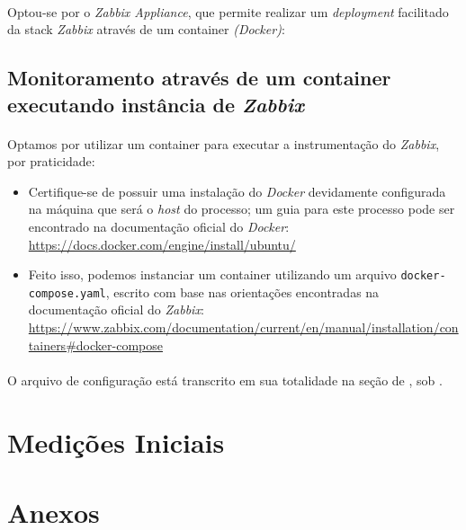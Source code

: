 \documentclass[12pt]{article}
\begin{document}
\paragraph{}
Optou-se por o \textit{Zabbix Appliance}, que permite realizar um \textit{deployment} facilitado
da stack \textit{Zabbix} através de um container \textit{(Docker)}:

\subsection{Monitoramento através de um container executando instância de \textit{Zabbix}}
\paragraph{}
Optamos por utilizar um container para executar a instrumentação do \textit{Zabbix}, por praticidade:

\begin{itemize}
  \item Certifique-se de possuir uma instalação do \textit{Docker} devidamente configurada na máquina que será o
    \textit{host} do processo; um guia para este processo pode ser encontrado na documentação oficial do
    \textit{Docker}: \\
    \url{https://docs.docker.com/engine/install/ubuntu/}
  \item Feito isso, podemos instanciar um container utilizando um arquivo \texttt{docker-compose.yaml}, escrito com base
    nas orientações encontradas na documentação oficial do \textit{Zabbix}: \\
    \url{https://www.zabbix.com/documentation/current/en/manual/installation/containers#docker-compose}
\end{itemize}

\paragraph{}
O arquivo de configuração está transcrito em sua totalidade na seção de , sob .

\section{Medições Iniciais}

\section{Anexos}\label{sec:anexos}
\end{document}
